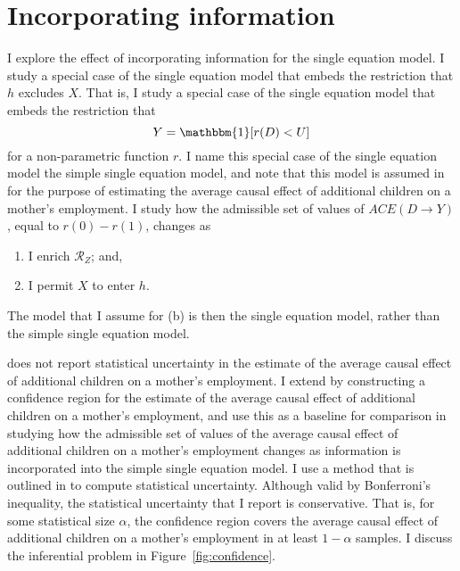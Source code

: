 \documentclass[10pt,a4paper,twoside]{article}
\numberwithin{equation}{section}
\begin{document}
\section{Incorporating information}
I explore the effect of incorporating information for the single equation model. I study a special case of the single equation model that embeds the restriction that $h$ excludes $X$. That is, I study a special case of the single equation model that embeds the restriction that 
\[Y=\mathbbm{1}[r(D)<U]\]
for a non-parametric function $r$. I name this special case of the single equation model the simple single equation model, and note that this model is assumed in \cite{cr13} for the purpose of estimating the average causal effect of additional children on a mother's employment. I study how the admissible set of values of $ACE(D\rightarrow Y)$, equal to $r(0)-r(1)$, changes as 
\begin{enumerate}[(a.)]
\item I enrich $\mathcal{R}_Z$; and,
\item I permit $X$ to enter $h$.
\end{enumerate}
The model that I assume for (b) is then the single equation model, rather than the simple single equation model. 

\cite{cr13} does not report statistical uncertainty in the estimate of the average causal effect of additional children on a mother's employment. I extend \cite{cr13} by constructing a confidence region for the estimate of the average causal effect of additional children on a mother's employment, and use this as a baseline for comparison in studying how the admissible set of values of the average causal effect of additional children on a mother's employment changes as information is incorporated into the simple single equation model. I use a method that is outlined in \cite{cHlr13} to compute statistical uncertainty. Although valid by Bonferroni's inequality, the statistical uncertainty that I report is conservative. That is, for some statistical size $\alpha$, the confidence region covers the average causal effect of additional children on a mother's employment in at least $1-\alpha$ samples. I discuss the inferential problem in Figure~\ref{fig:confidence}.
\end{document}
